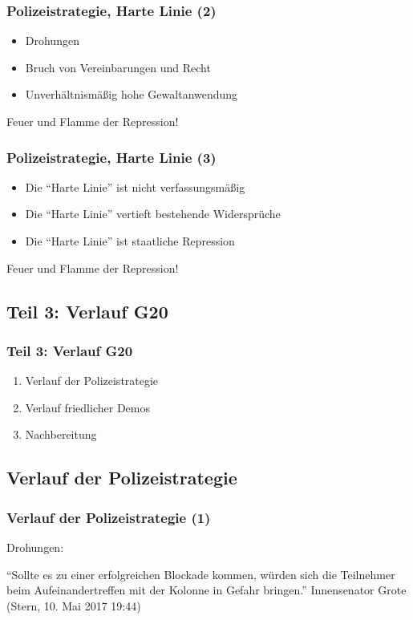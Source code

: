 \documentclass[]{beamer}
\begin{document}
	\begin{frame}
	\frametitle{Polizeistrategie, Harte Linie (2)}
	\begin{itemize}
		\item Drohungen
		\item Bruch von Vereinbarungen und Recht
		\item Unverhältnismäßig hohe Gewaltanwendung
	\end{itemize}
	\vfill
	Feuer und Flamme der Repression!
\end{frame}

	\begin{frame}
	\frametitle{Polizeistrategie, Harte Linie (3)}
	\begin{itemize}
		\item Die \enquote{Harte Linie} ist nicht verfassungsmäßig
		\item Die \enquote{Harte Linie} vertieft bestehende Widersprüche
		\item Die \enquote{Harte Linie} ist staatliche Repression
	\end{itemize}
	\vfill
	Feuer und Flamme der Repression!
\end{frame}

	\begin{frame}
	\section{Teil 3: Verlauf G20}
	\frametitle{Teil 3: Verlauf G20}
	\begin{enumerate}
		\item Verlauf der Polizeistrategie
		\item Verlauf friedlicher Demos
		\item Nachbereitung
	\end{enumerate}
\end{frame}

	\begin{frame}
	\subsection{Verlauf der Polizeistrategie}
	\frametitle{Verlauf der Polizeistrategie (1)}
	Drohungen:\par 
	\enquote{Sollte es zu einer erfolgreichen Blockade kommen, würden sich die Teilnehmer beim Aufeinandertreffen mit der Kolonne in Gefahr bringen.} Innensenator Grote (Stern, 10. Mai 2017 19:44)
\end{frame}
\end{document}
